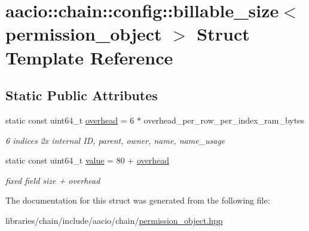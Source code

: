 \hypertarget{structaacio_1_1chain_1_1config_1_1billable__size_3_01permission__object_01_4}{}\section{aacio\+:\+:chain\+:\+:config\+:\+:billable\+\_\+size$<$ permission\+\_\+object $>$ Struct Template Reference}
\label{structaacio_1_1chain_1_1config_1_1billable__size_3_01permission__object_01_4}
\subsection*{Static Public Attributes}
\begin{DoxyCompactItemize}
\item 
\mbox{\label{structaacio_1_1chain_1_1config_1_1billable__size_3_01permission__object_01_4_a559b222d8dba9fdda06cfd2ec5770df6}} 
static const uint64\+\_\+t \mbox{\hyperlink{structaacio_1_1chain_1_1config_1_1billable__size_3_01permission__object_01_4_a559b222d8dba9fdda06cfd2ec5770df6}{overhead}} = 6 $\ast$ overhead\+\_\+per\+\_\+row\+\_\+per\+\_\+index\+\_\+ram\+\_\+bytes
\begin{DoxyCompactList}\small\item\em 6 indices 2x internal ID, parent, owner, name, name\+\_\+usage \end{DoxyCompactList}\item 
\mbox{\label{structaacio_1_1chain_1_1config_1_1billable__size_3_01permission__object_01_4_a3fe32b49547e7ca77329b61e76d993df}} 
static const uint64\+\_\+t \mbox{\hyperlink{structaacio_1_1chain_1_1config_1_1billable__size_3_01permission__object_01_4_a3fe32b49547e7ca77329b61e76d993df}{value}} = 80 + \mbox{\hyperlink{structaacio_1_1chain_1_1config_1_1billable__size_3_01permission__object_01_4_a559b222d8dba9fdda06cfd2ec5770df6}{overhead}}
\begin{DoxyCompactList}\small\item\em fixed field size + overhead \end{DoxyCompactList}\end{DoxyCompactItemize}


The documentation for this struct was generated from the following file\+:\begin{DoxyCompactItemize}
\item 
libraries/chain/include/aacio/chain/\mbox{\hyperlink{permission__object_8hpp}{permission\+\_\+object.\+hpp}}\end{DoxyCompactItemize}
